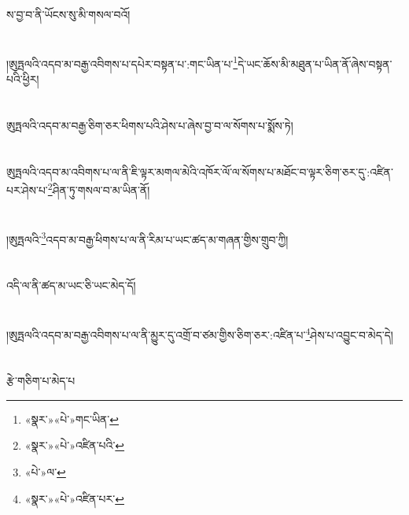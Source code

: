 ས་བྱ་བ་ནི་ཡོངས་སུ་མི་གསལ་བའོ།\chapter{ }།ཨུཏྤལའི་འདབ་མ་བརྒྱ་འབིགས་པ་དཔེར་བསྟན་པ་:གང་ཡིན་པ་\footnote{«སྣར་»«པེ་»གང་ཡིན་}དེ་ཡང་ཆོས་མི་མཐུན་པ་ཡིན་ནོ་ཞེས་བསྟན་པའི་ཕྱིར།\chapter{ }ཨུཏྤལའི་འདབ་མ་བརྒྱ་ཅིག་ཅར་ཕིགས་པའི་ཤེས་པ་ཞེས་བྱ་བ་ལ་སོགས་པ་སྨོས་ཏེ།\chapter{ }ཨུཏྤལའི་འདབ་མ་འབིགས་པ་ལ་ནི་ཇི་ལྟར་མགལ་མེའི་འཁོར་ལོ་ལ་སོགས་པ་མཐོང་བ་ལྟར་ཅིག་ཅར་དུ་:འཛིན་པར་ཤེས་པ་\footnote{«སྣར་»«པེ་»འཛིན་པའི་}ཤིན་ཏུ་གསལ་བ་མ་ཡིན་ནོ།\chapter{ }།ཨུཏྤལའི་\footnote{«པེ་»ལ་}འདབ་མ་བརྒྱ་ཕིགས་པ་ལ་ནི་རིམ་པ་ཡང་ཚད་མ་གཞན་གྱིས་གྲུབ་ཀྱི།\chapter{ }འདི་ལ་ནི་ཚད་མ་ཡང་ཅི་ཡང་མེད་དོ།\chapter{ }།ཨུཏྤལའི་འདབ་མ་བརྒྱ་འབིགས་པ་ལ་ནི་མྱུར་དུ་འགྲོ་བ་ཙམ་གྱིས་ཅིག་ཅར་:འཛིན་པ་\footnote{«སྣར་»«པེ་»འཛིན་པར་}ཤེས་པ་འབྱུང་བ་མེད་དེ།\chapter{ }རྩེ་གཅིག་པ་མེད་པ